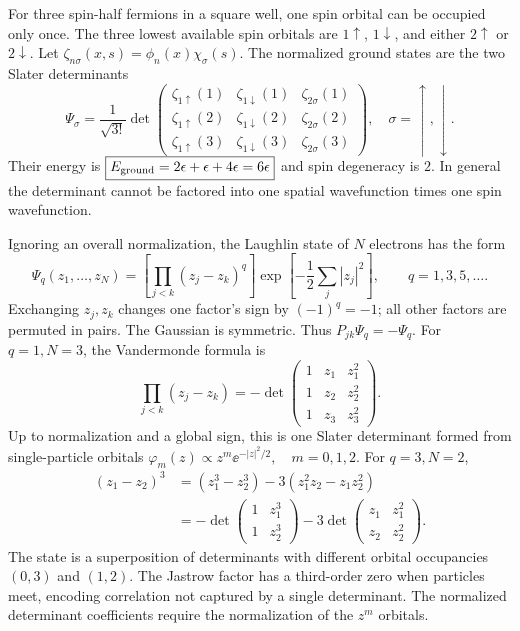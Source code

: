 For three spin-half fermions in a square
well, one spin orbital can be occupied
only once. The three lowest available
spin orbitals are $1\uparrow$, $1\downarrow$,
and either $2\uparrow$ or $2\downarrow$.
Let $\zeta_{n\sigma}(x,s)=\phi_n(x)\chi_\sigma(s)$.
The normalized ground states are the two
Slater determinants
\begin{equation}
\boxed{\Psi_{\sigma}=
\frac1{\sqrt{3!}}
\det\begin{pmatrix}
\zeta_{1\uparrow}(1)&\zeta_{1\downarrow}(1)&\zeta_{2\sigma}(1)\\
\zeta_{1\uparrow}(2)&\zeta_{1\downarrow}(2)&\zeta_{2\sigma}(2)\\
\zeta_{1\uparrow}(3)&\zeta_{1\downarrow}(3)&\zeta_{2\sigma}(3)
\end{pmatrix}},
\quad \sigma=\uparrow,\downarrow.
\end{equation}
Their energy is
$\boxed{E_{\rm ground}=2\epsilon+\epsilon+4\epsilon
=6\epsilon}$ and spin degeneracy is
$\boxed{2}$. In general the determinant
cannot be factored into one spatial
wavefunction times one spin wavefunction.

Ignoring an overall normalization, the
Laughlin state of $N$ electrons has the form
\begin{equation}
\Psi_q(z_1,\ldots,z_N)=
\left[\prod_{j<k}(z_j-z_k)^q\right]
\exp\left[-\frac12\sum_j|z_j|^2\right],
\qquad q=1,3,5,\ldots .
\end{equation}
Exchanging $z_j,z_k$ changes one factor's
sign by $(-1)^q=-1$; all other factors
are permuted in pairs. The Gaussian is
symmetric. Thus
$\boxed{P_{jk}\Psi_q=-\Psi_q}$.
For $q=1,N=3$, the Vandermonde formula is
\begin{equation}
\prod_{j<k}(z_j-z_k)=
-\det\begin{pmatrix}
1&z_1&z_1^2\\
1&z_2&z_2^2\\
1&z_3&z_3^2
\end{pmatrix}.
\end{equation}
Up to normalization and a global sign,
this is one Slater determinant formed from
single-particle orbitals
$\boxed{\varphi_m(z)\propto z^m\ee^{-|z|^2/2},
\quad m=0,1,2}$.
For $q=3,N=2$,
\begin{align}
(z_1-z_2)^3
&=(z_1^3-z_2^3)-3(z_1^2z_2-z_1z_2^2)\\
&=-\det\begin{pmatrix}1&z_1^3\\1&z_2^3\end{pmatrix}
-3\det\begin{pmatrix}z_1&z_1^2\\z_2&z_2^2\end{pmatrix}.
\end{align}
The state is a superposition of
determinants with different orbital
occupancies $(0,3)$ and $(1,2)$.
The Jastrow factor has a third-order
zero when particles meet, encoding
correlation not captured by a single
determinant. The normalized determinant
coefficients require the normalization
of the $z^m$ orbitals.

